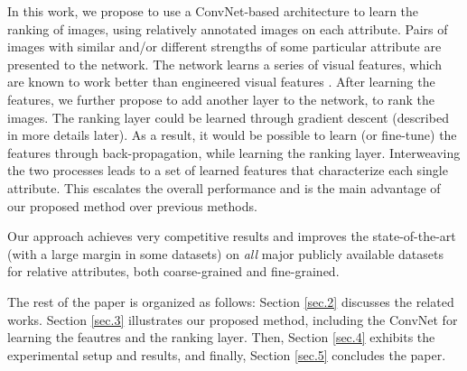 In this work, we propose to use a ConvNet-based architecture to learn the ranking of images, using relatively annotated images on each attribute. Pairs of images with similar and/or different strengths of some particular attribute are presented to the network. The network  learns a series of visual features, which are known to work better than engineered visual features \cite{offtheshelf}. After learning the features, we further propose to add another layer to the network, to rank the images. The ranking layer could be learned through gradient descent (described in more details later). As a result, it would be possible to learn (or fine-tune) the features through back-propagation, while learning the ranking layer. Interweaving the two processes leads to a set of learned features that characterize each single attribute. This escalates the overall performance and is the main advantage of our proposed method over previous methods. 

Our approach achieves very competitive results and improves the state-of-the-art (with a large margin in some datasets) on {\it all} major publicly available datasets for relative attributes, both coarse-grained and fine-grained.

The rest of the paper is organized as follows: Section \ref{sec.2} discusses the related works. Section \ref{sec.3} illustrates our proposed method, including the ConvNet for learning the feautres and the ranking layer. Then, Section \ref{sec.4} exhibits the experimental setup and results, and finally, Section \ref{sec.5} concludes the paper.
